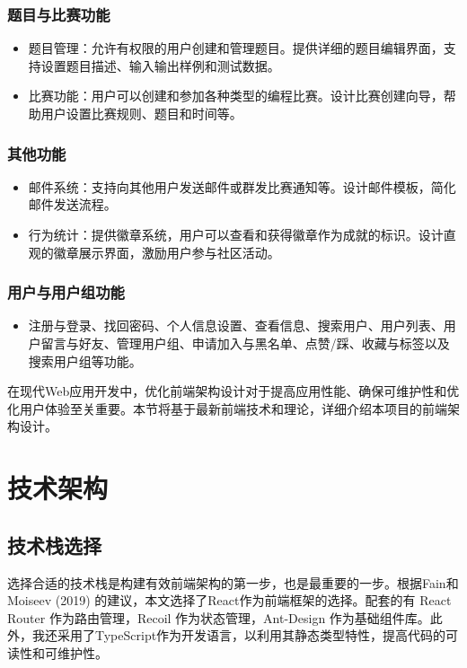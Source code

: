 \documentclass[12pt,a4paper]{article}
\begin{document}
\begin{CJK*}{UTF8}{gbsn}
\subsubsection{题目与比赛功能}
\begin{itemize}
  \item 题目管理：允许有权限的用户创建和管理题目。提供详细的题目编辑界面，支持设置题目描述、输入输出样例和测试数据。
  \item 比赛功能：用户可以创建和参加各种类型的编程比赛。设计比赛创建向导，帮助用户设置比赛规则、题目和时间等。
\end{itemize}
\subsubsection{其他功能}
\begin{itemize}
  \item 邮件系统：支持向其他用户发送邮件或群发比赛通知等。设计邮件模板，简化邮件发送流程。
  \item 行为统计：提供徽章系统，用户可以查看和获得徽章作为成就的标识。设计直观的徽章展示界面，激励用户参与社区活动。
\end{itemize}
\subsubsection{用户与用户组功能}
\begin{itemize}
  \item  注册与登录、找回密码、个人信息设置、查看信息、搜索用户、用户列表、用户留言与好友、管理用户组、申请加入与黑名单、点赞/踩、收藏与标签以及搜索用户组等功能。
\end{itemize}


在现代Web应用开发中，优化前端架构设计对于提高应用性能、确保可维护性和优化用户体验至关重要。本节将基于最新前端技术和理论，详细介绍本项目的前端架构设计。

\section{技术架构}

\subsection{技术栈选择}
选择合适的技术栈是构建有效前端架构的第一步，也是最重要的一步。根据Fain和Moiseev (2019) 的建议\cite{fain2019proangular}，本文选择了React作为前端框架的选择。配套的有 React Router 作为路由管理，Recoil 作为状态管理，Ant-Design 作为基础组件库。此外，我还采用了TypeScript作为开发语言，以利用其静态类型特性，提高代码的可读性和可维护性。


\end{CJK*}
\end{document}
